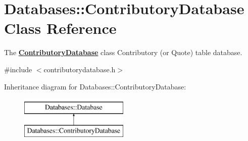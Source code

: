 \hypertarget{classDatabases_1_1ContributoryDatabase}{\section{Databases\-:\-:Contributory\-Database Class Reference}
\label{classDatabases_1_1ContributoryDatabase}
}


The {\bfseries \hyperlink{classDatabases_1_1ContributoryDatabase}{Contributory\-Database}} class Contributory (or Quote) table database.  




{\ttfamily \#include $<$contributorydatabase.\-h$>$}

Inheritance diagram for Databases\-:\-:Contributory\-Database\-:\begin{figure}[H]
\begin{center}
\leavevmode
\includegraphics[height=2.000000cm]{dc/da5/classDatabases_1_1ContributoryDatabase}
\end{center}
\end{figure}
